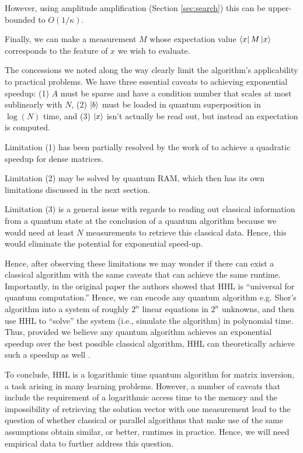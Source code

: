 \documentclass[main.tex]{subfiles}
\begin{document}
However, using amplitude amplification (Section \ref{sec:search}) this can be upper-bounded to $O(1/\kappa)$. 

Finally, we can make a measurement $M$ whose expectation value $\bra{x}M\ket{x}$ corresponds to the feature of $x$ we wish to evaluate. 

The concessions we noted along the way clearly limit the algorithm's applicability to practical problems. We have three essential caveats to achieving exponential speedup: (1) $A$ must be sparse and have a condition number that scales at most sublinearly with $N$, (2) $\ket{b}$ must be loaded in quantum superposition in $\log(N)$ time, and (3) $\ket{x}$ isn't actually be read out, but instead an expectation is computed.

Limitation (1) has been partially resolved by the work of \cite{wossnig2018quantum} to achieve a quadratic speedup for dense matrices. 

Limitation (2) may be solved by quantum RAM, which then has its own limitations discussed in the next section. 

Limitation (3) is a general issue with regards to reading out classical information from a quantum state at the conclusion of a quantum algorithm because we would need at least $N$ measurements to retrieve this classical data. Hence, this would eliminate the potential for exponential speed-up.  

Hence, after observing these limitations we may wonder if there can exist a classical algorithm with the same caveats that can achieve the same runtime. Importantly, in the original paper the authors showed that HHL is “universal for quantum computation.” Hence, we can encode any quantum algorithm e.g. Shor's algorithm into a system of roughly $2^n$ linear equations in $2^n$ unknowns, and then use HHL to “solve” the system (i.e., simulate the algorithm) in polynomial time. Thus, provided we believe any quantum algorithm achieves an exponential speedup over the best possible classical algorithm, HHL can theoretically achieve such a speedup as well \cite{aaronson2015read}.

To conclude, HHL is a logarithmic time quantum algorithm for matrix inversion, a task arising in many learning problems. However, a number of caveats that include the requirement of a logarithmic access time to the memory and the impossibility of retrieving the solution vector with one measurement lead to the question of whether classical or parallel algorithms that make use of the same assumptions obtain similar, or better, runtimes in practice. Hence, we will need empirical data to further address this question.
\end{document}
